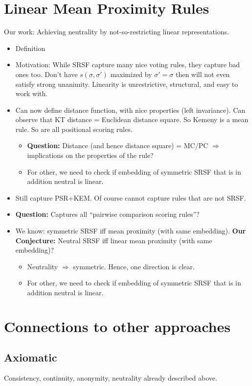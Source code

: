 \documentclass[10pt,letterpaper]{article}
\begin{document}
\section{Linear Mean Proximity Rules}

Our work: Achieving neutrality by not-so-restricting linear representations.
\begin{itemize}
\item Definition
\item Motivation: While SRSF capture many nice voting rules, they capture bad ones too. Don't have $s(\sigma,\sigma')$ maximized by $\sigma' = \sigma$ then will not even satisfy strong unanimity. Linearity is unrestrictive, structural, and easy to work with. 
\item Can now define distance function, with nice properties (left invariance). Can observe that KT distance = Euclidean distance square. So Kemeny is a mean rule. So are all positional scoring rules. 
	\begin{itemize}
	\item {\bf Question:} Distance (and hence distance square) = MC/PC $\Rightarrow$ implications on the properties of the rule?
	\item For other, we need to check if embedding of symmetric SRSF that is in addition neutral is linear. 
	\end{itemize}
\item Still capture PSR+KEM. Of course cannot capture rules that are not SRSF. 
\item {\bf Question:} Captures all ``pairwise comparison scoring rules''?
\item We know: symmetric SRSF iff mean proximity (with same embedding). {\bf Our Conjecture:} Neutral SRSF iff linear mean proximity (with same embedding)?
	\begin{itemize}
	\item Neutrality $\Rightarrow$ symmetric. Hence, one direction is clear.
	\item For other, we need to check if embedding of symmetric SRSF that is in addition neutral is linear. 
	\end{itemize}
\end{itemize}

\section{Connections to other approaches}
\subsection{Axiomatic}
Consistency, continuity, anonymity, neutrality already described above. 
\end{document}
